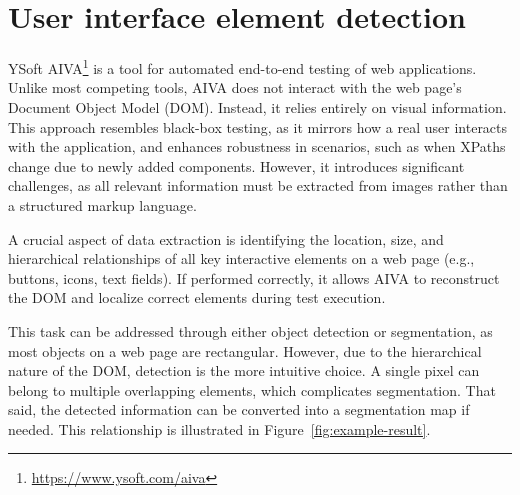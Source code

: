 \documentclass[
  digital,     %
  oneside,     %
  nosansbold,  %
  nocolorbold, %
  lof,         %
  lot,         %
]{fithesis4}
\begin{document}
\chapter{User interface element detection}

YSoft AIVA\footnote{\url{https://www.ysoft.com/aiva}} is a tool for automated end-to-end testing of web applications. Unlike most competing tools, AIVA does not interact with the web page's Document Object Model (DOM). Instead, it relies entirely on visual information. This approach resembles black-box testing, as it mirrors how a real user interacts with the application, and enhances robustness in scenarios, such as when XPaths change due to newly added components. However, it introduces significant challenges, as all relevant information must be extracted from images rather than a structured markup language.

A crucial aspect of data extraction is identifying the location, size, and hierarchical relationships of all key interactive elements on a web page (e.g., buttons, icons, text fields). If performed correctly, it allows AIVA to reconstruct the DOM and localize correct elements during test execution.

This task can be addressed through either object detection or segmentation, as most objects on a web page are rectangular. However, due to the hierarchical nature of the DOM, detection is the more intuitive choice. A single pixel can belong to multiple overlapping elements, which complicates segmentation. That said, the detected information can be converted into a segmentation map if needed. This relationship is illustrated in Figure~\ref{fig:example-result}.
\end{document}
